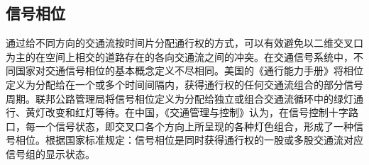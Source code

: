 \subsection{信号相位}
通过给不同方向的交通流按时间片分配通行权的方式，可以有效避免以二维交叉口为主的在空间上相交的道路存在的各向交通流之间的冲突。在交通信号系统中，不同国家对交通信号相位的基本概念定义不尽相同。美国的《通行能力手册》\cite{2000Highway}将相位定义为分配给在一个或多个时间间隔内，获得通行权的任何交通流组合的部分信号周期。联邦公路管理局将信号相位定义为分配给独立或组合交通流循环中的绿灯通行、黄灯改变和红灯等待\cite{2003Manual}。在中国，《交通管理与控制》\cite{yangpeikun2003}认为，在信号控制十字路口，每一个信号状态，即交叉口各个方向上所呈现的各种灯色组合，形成了一种信号相位。根据国家标准\cite{GB_T_31418}规定：信号相位是同时获得通行权的一股或多股交通流对应信号组的显示状态。






